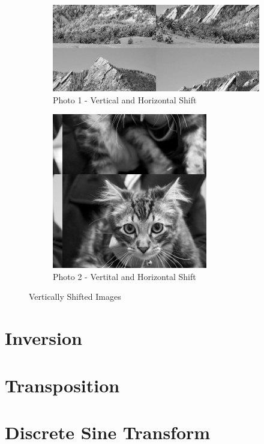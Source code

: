 \documentclass[10pt]{report}
\begin{document}
\begin{figure}[ht]
    \centering
    \begin{subfigure}{\textwidth}
        \centering
        \includegraphics[scale=0.7]{./img/vhsg1.png}
        \caption{Photo 1 - Vertical and Horizontal Shift}
        \label{fig:p1vg}
    \end{subfigure}
    \begin{subfigure}{\textwidth}
        \centering
        \includegraphics[scale=0.7]{./img/vhsg2.png}
        \caption{Photo 2 - Vertital and Horizontal Shift}
        \label{fig:p2vg}
    \end{subfigure}
    \caption{Vertically Shifted Images}
    \label{fig:vs_images}
\end{figure}

\newpage

\section{Inversion}

\section{Transposition}

\section{Discrete Sine Transform}
\end{document}
